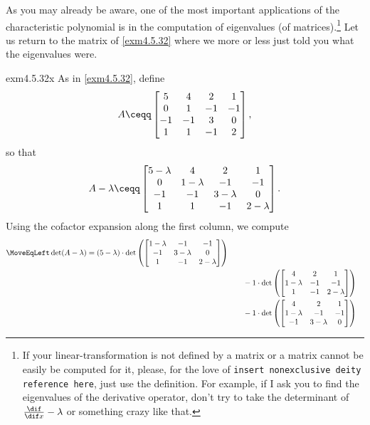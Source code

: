 As you may already be aware, one of the most important applications of the characteristic polynomial is in the computation of eigenvalues (of matrices).\footnote{If your linear-transformation is not defined by a matrix or a matrix cannot be easily be computed for it, please, for the love of \texttt{insert nonexclusive deity reference here}, just use the definition.  For example, if I ask you to find the eigenvalues of the derivative operator, don't try to take the determinant of $\frac{\dif}{\dif x}-\lambda$ or something crazy like that.}  Let us return to the matrix of \cref{exm4.5.32} where we more or less just told you what the eigenvalues were.
\begin{exm}{}{exm4.5.32x}
	As in \cref{exm4.5.32}, define
	\begin{equation}
		A\ceqq \begin{bmatrix}5 & 4 & 2 & 1 \\ 0 & 1 & -1 & -1 \\ -1 & -1 & 3 & 0 \\ 1 & 1 & -1 & 2\end{bmatrix},
	\end{equation}
	so that
	\begin{equation}
		A-\lambda \ceqq \begin{bmatrix}5-\lambda & 4 & 2 & 1 \\ 0 & 1-\lambda & -1 & -1 \\ -1 & -1 & 3-\lambda & 0 \\ 1 & 1 & -1 & 2-\lambda \end{bmatrix}.
	\end{equation}
	Using the cofactor expansion along the first column, we compute
	{\scriptsize
	\begin{equation}
		\begin{split}
			\MoveEqLeft
			\det (A-\lambda )=(5-\lambda )\cdot \det \left( \begin{bmatrix}1-\lambda & -1 & -1 \\ -1 & 3-\lambda & 0 \\ 1 & -1 & 2-\lambda \end{bmatrix}\right) \\ & \qquad -1\cdot \det \left( \begin{bmatrix}4 & 2 & 1 \\ 1-\lambda & -1 & -1 \\ 1 & -1 & 2-\lambda \end{bmatrix}\right) \\ & \qquad -1\cdot \det \left( \begin{bmatrix}4 & 2 & 1 \\ 1-\lambda & -1 & -1 \\ -1 & 3-\lambda & 0\end{bmatrix}\right) \\

\end{split}
\end{equation}}
\end{exm}
